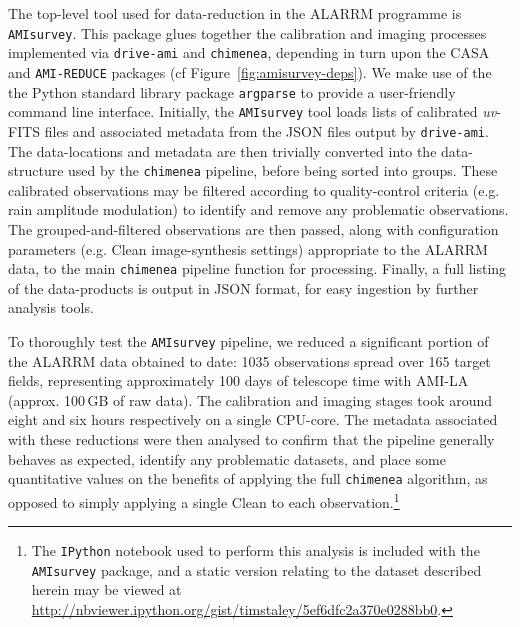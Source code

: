 \documentclass[5p,authoryear]{elsarticle}
\begin{document}
The top-level tool used for data-reduction in the ALARRM programme is \texttt{AMIsurvey}. 
This package glues together the calibration and imaging processes implemented via \texttt{drive-ami} and \texttt{chimenea}, depending in turn upon the CASA and \texttt{AMI-REDUCE} packages (cf Figure~\ref{fig:amisurvey-deps}). 
We make use of the the Python standard library package \texttt{argparse} to provide a user-friendly command line interface.
Initially, the \texttt{AMIsurvey} tool loads lists of calibrated \textit{uv}-FITS files and associated metadata from the JSON files output by \texttt{drive-ami}. 
The data-locations and metadata are then trivially converted into the data-structure used by the \texttt{chimenea} pipeline, before being sorted into groups. 
These calibrated observations may be filtered according to quality-control criteria (e.g. rain amplitude modulation) to identify and remove any problematic observations.
The grouped-and-filtered observations are then passed, along with configuration parameters (e.g. Clean image-synthesis settings) appropriate to the ALARRM data, to the main \texttt{chimenea} pipeline function for processing. 
Finally, a full listing of the data-products is output in JSON format, for easy ingestion by further analysis tools. 

To thoroughly test the \texttt{AMIsurvey} pipeline, we reduced a significant portion of the ALARRM data obtained to date: 1035 observations spread over 165 target fields, representing approximately 100 days of telescope time with AMI-LA (approx. 100\,GB of raw data). 
The calibration and imaging stages took around eight and six hours respectively on a single CPU-core. 
The metadata associated with these reductions were then analysed to confirm that the pipeline generally behaves as expected, identify any problematic datasets, and place some quantitative values on the benefits of applying the full \texttt{chimenea} algorithm, as opposed to simply applying a single Clean to each observation.\footnote{%
 The \texttt{IPython} notebook used to perform this analysis is included with the \texttt{AMIsurvey} package, and a static version relating to the dataset described herein may be viewed at  \url{http://nbviewer.ipython.org/gist/timstaley/5ef6dfc2a370e0288bb0}.
}
\end{document}
